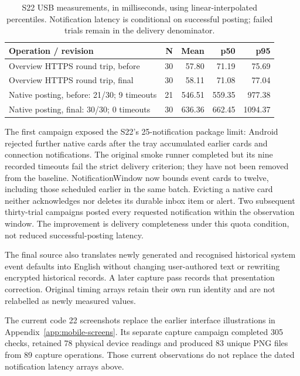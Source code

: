 \begin{table}[H]\small
\caption{S22 USB measurements, in milliseconds, using linear-interpolated percentiles. Notification latency is conditional on successful posting; failed trials remain in the delivery denominator.}\label{tab:usb-latency}
\begin{tabularx}{\textwidth}{@{}Yrrrr@{}}\toprule
Operation / revision & N & Mean & p50 & p95\\\midrule
Overview HTTPS round trip, before & 30 & 57.80 & 71.19 & 75.69\\
Overview HTTPS round trip, final & 30 & 58.11 & 71.08 & 77.04\\
Native posting, before: 21/30; 9 timeouts & 21 & 546.51 & 559.35 & 977.38\\
Native posting, final: 30/30; 0 timeouts & 30 & 636.36 & 662.45 & 1094.37\\\bottomrule
\end{tabularx}
\end{table}

The first campaign exposed the S22's 25-notification package limit: Android rejected further native cards after the tray accumulated earlier cards and connection notifications. The original smoke runner completed but its nine recorded timeouts fail the strict delivery criterion; they have not been removed from the baseline. NotificationWindow now bounds event cards to twelve, including those scheduled earlier in the same batch. Evicting a native card neither acknowledges nor deletes its durable inbox item or alert. Two subsequent thirty-trial campaigns posted every requested notification within the observation window. The improvement is delivery completeness under this quota condition, not reduced successful-posting latency.\cite{systemrun}

The final source also translates newly generated and recognised historical system event defaults into English without changing user-authored text or rewriting encrypted historical records. A later capture pass records that presentation correction. Original timing arrays retain their own run identity and are not relabelled as newly measured values.

\medskip
The current code 22 screenshots replace the earlier interface illustrations in Appendix~\ref{app:mobile-screens}. Its separate capture campaign completed 305 checks, retained 78 physical device readings and produced 83 unique PNG files from 89 capture operations. Those current observations do not replace the dated notification latency arrays above.\cite{appatlas}
